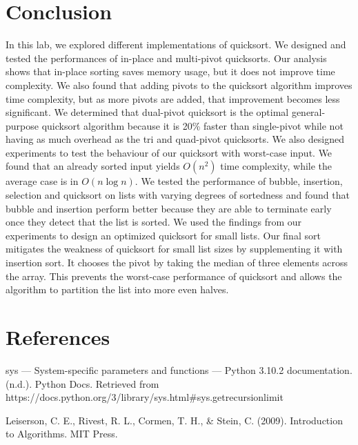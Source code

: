 \documentclass[12pt]{article}
\begin{document}
\section{Conclusion}
 In this lab, we explored different implementations of quicksort. We designed and tested the performances of in-place and multi-pivot quicksorts. Our analysis shows that in-place sorting saves memory usage, but it does not improve time complexity. We also found that adding pivots to the quicksort algorithm improves time complexity, but as more pivots are added, that improvement becomes less significant. We determined that dual-pivot quicksort is the optimal general-purpose quicksort algorithm because it is 20\% faster than single-pivot while not having as much overhead as the tri and quad-pivot quicksorts. We also designed experiments to test the behaviour of our quicksort with worst-case input. We found that an already sorted input yields $O(n^2)$ time complexity, while the average case is in $O(n\log{n})$. We tested the performance of bubble, insertion, selection and quicksort on lists with varying degrees of sortedness and found that bubble and insertion perform better because they are able to terminate early once they detect that the list is sorted. We used the findings from our experiments to design an optimized quicksort for small lists. Our final sort mitigates the weakness of quicksort for small list sizes by supplementing it with insertion sort. It chooses the pivot by taking the median of three elements across the array. This prevents the worst-case performance of quicksort and allows the algorithm to partition the list into more even halves.

\newpage\section*{References}
\begin{enumerate}[label={[\arabic*]}]
\item	sys — System-specific parameters and functions — Python 3.10.2 documentation. (n.d.). Python Docs. Retrieved from https://docs.python.org/3/library/sys.html\#sys.getrecursionlimit
\item	Leiserson, C. E., Rivest, R. L., Cormen, T. H., \& Stein, C. (2009). Introduction to Algorithms. MIT Press.

\end{enumerate}
\end{document}
